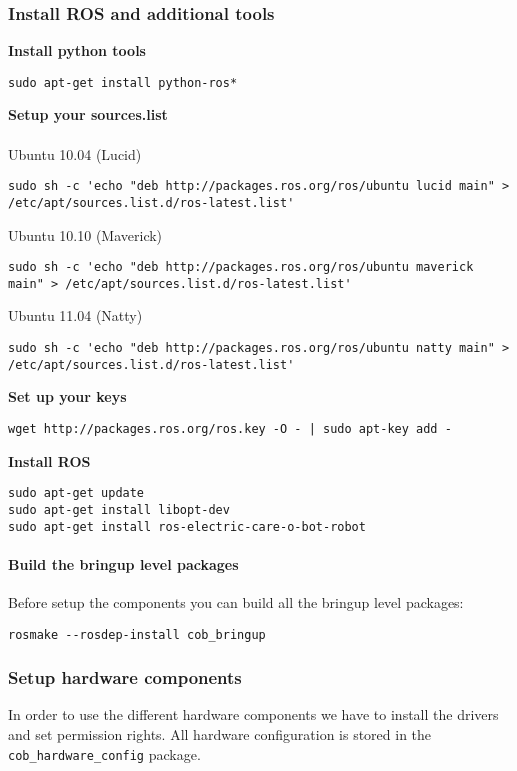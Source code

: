 \subsubsection{Install ROS and additional tools}
\textbf{Install python tools}
\begin{lstlisting}
sudo apt-get install python-ros*
\end{lstlisting}
\textbf{Setup your sources.list}
\\
\\Ubuntu 10.04 (Lucid)
\begin{lstlisting}
sudo sh -c 'echo "deb http://packages.ros.org/ros/ubuntu lucid main" > /etc/apt/sources.list.d/ros-latest.list'
\end{lstlisting}
Ubuntu 10.10 (Maverick)
\begin{lstlisting}
sudo sh -c 'echo "deb http://packages.ros.org/ros/ubuntu maverick main" > /etc/apt/sources.list.d/ros-latest.list'
\end{lstlisting}
Ubuntu 11.04 (Natty)
\begin{lstlisting}
sudo sh -c 'echo "deb http://packages.ros.org/ros/ubuntu natty main" > /etc/apt/sources.list.d/ros-latest.list'
\end{lstlisting}
\textbf{Set up your keys}
\begin{lstlisting}
wget http://packages.ros.org/ros.key -O - | sudo apt-key add -
\end{lstlisting}
\textbf{Install ROS}
\begin{lstlisting}
sudo apt-get update
sudo apt-get install libopt-dev
sudo apt-get install ros-electric-care-o-bot-robot
\end{lstlisting}

\paragraph{Build the bringup level packages}
Before setup the components you can build all the bringup level packages:
\begin{lstlisting}
rosmake --rosdep-install cob_bringup
\end{lstlisting}


\subsubsection{Setup hardware components}
In order to use the different hardware components we have to install the drivers and set permission rights. All hardware configuration is stored in the \texttt{cob\_hardware\_config} package.

